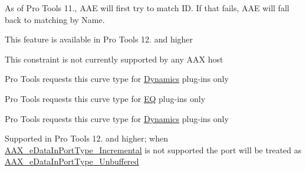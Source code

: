 \begin{DoxyRefList}
As of Pro Tools 11., A\+A\+E will first try to match I\+D. If that fails, A\+A\+E will fall back to matching by Name. 
\item[\label{a00381__compatibility_notes000005}%
\hypertarget{a00381__compatibility_notes000005}{}%
Module \hyperlink{a00364}{A\+A\+X\+\_\+\+Digi\+Trace\+\_\+\+Guide} ]This feature is available in Pro Tools 12. and higher 
\item[\label{a00381__compatibility_notes000044}%
\hypertarget{a00381__compatibility_notes000044}{}%
global\+Scope$>$ Member \hyperlink{a00206_a0c5d795c1fd021c5b9b541febc34601aa12ffeaf435dc753cbd90adb409b739cd}{A\+A\+X\+\_\+e\+Constraint\+Location\+Mask\+\_\+\+Fixed\+Latency\+Domain} ]This constraint is not currently supported by any A\+A\+X host  
\item[\label{a00381__compatibility_notes000028}%
\hypertarget{a00381__compatibility_notes000028}{}%
global\+Scope$>$ Member \hyperlink{a00342_gga59c73d8f51c5c55d54a728eff39da884aed3949ae429e38e979f7d005759c579e}{A\+A\+X\+\_\+e\+Curve\+Type\+\_\+\+Dynamics} ]Pro Tools requests this curve type for \hyperlink{a00206_aef9637518fb1ac0e2f403444c73aba4aa1e8d5202983c58aa0346a9a547f55bd9}{Dynamics} plug-\/ins only  
\item[\label{a00381__compatibility_notes000027}%
\hypertarget{a00381__compatibility_notes000027}{}%
global\+Scope$>$ Member \hyperlink{a00342_gga59c73d8f51c5c55d54a728eff39da884a01b32d7031ceff45f7acad05dcddad19}{A\+A\+X\+\_\+e\+Curve\+Type\+\_\+\+E\+Q} ]Pro Tools requests this curve type for \hyperlink{a00206_aef9637518fb1ac0e2f403444c73aba4aad84edabff7d1d8732079b467c07dedcc}{E\+Q} plug-\/ins only  
\item[\label{a00381__compatibility_notes000029}%
\hypertarget{a00381__compatibility_notes000029}{}%
global\+Scope$>$ Member \hyperlink{a00342_gga59c73d8f51c5c55d54a728eff39da884a011b1b00d6189a8903735dcae2f8bc93}{A\+A\+X\+\_\+e\+Curve\+Type\+\_\+\+Reduction} ]Pro Tools requests this curve type for \hyperlink{a00206_aef9637518fb1ac0e2f403444c73aba4aa1e8d5202983c58aa0346a9a547f55bd9}{Dynamics} plug-\/ins only  
\item[\label{a00381__compatibility_notes000045}%
\hypertarget{a00381__compatibility_notes000045}{}%
global\+Scope$>$ Member \hyperlink{a00206_ab5677b173ad8647c24d34d28272d11fca4c356b21e878cfafca33ff61e1044b2e}{A\+A\+X\+\_\+e\+Data\+In\+Port\+Type\+\_\+\+Incremental} ]Supported in Pro Tools 12. and higher; when \hyperlink{a00206_ab5677b173ad8647c24d34d28272d11fca4c356b21e878cfafca33ff61e1044b2e}{A\+A\+X\+\_\+e\+Data\+In\+Port\+Type\+\_\+\+Incremental} is not supported the port will be treated as \hyperlink{a00206_ab5677b173ad8647c24d34d28272d11fca43dc59a68b369ee607f70700bfd02c2d}{A\+A\+X\+\_\+e\+Data\+In\+Port\+Type\+\_\+\+Unbuffered}  

\end{DoxyRefList}
